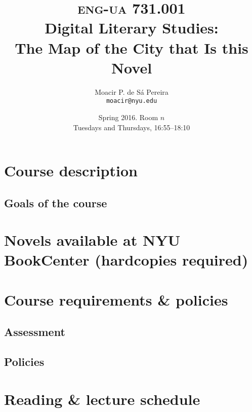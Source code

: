 \documentclass[11pt,article,oneside]{memoir}
\makeatletter
\def\myauthor{Author}
\def\mytitle{Title}
\def\myaddress{}
\def\myemail{}
\def\mycoursecode{}
\def\mycoursename{}
\def\myterm{}
\def\mycoursecode{eng-ua 731.001}
\def\mycoursename{Digital Literary Studies:\\ The Map of the City that Is this Novel}
\def\myterm{Spring 2016}
\def\myaddress{Room $n$}
\def\myemail{moacir@nyu.edu}
\def\myauthor{Moacir P. de Sá Pereira}
\def\mytitle{{\normalsize \textsc{\mycoursecode}\\} \HUGE \mycoursename}
\makeatother
\begin{document}
 \setsansfont[Mapping=tex-text]{Helvetica} 
 \setmonofont[Mapping=tex-text,Scale=0.8]{DejaVu Sans Mono}
 


\def\ind{\hangindent=1 true cm\hangafter=1 \noindent}


\title{\LARGE \mytitle}     
\author{\Large\myauthor\\ \footnotesize\texttt{\noindent\myemail}}
\date{\myterm. \myaddress \\ Tuesdays and Thursdays, 16:55--18:10}

\maketitle

%
%

\section*{Course description}



\subsection*{Goals of the course}

     
\section*{Novels available at NYU BookCenter \small (hardcopies required)}


	
\section*{Course requirements \& policies}

  \subsection*{Assessment}
  

	\subsection*{Policies}
	

\newpage

\section*{Reading \& lecture schedule}


\newpage



\newpage
\printbibliography 
\end{document}
